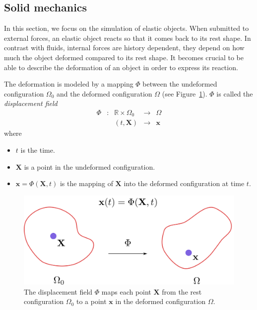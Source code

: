 \subsection{Solid mechanics}
\label{subsec:solidMechanics}
In this section, we focus on the simulation of elastic objects. When submitted to external forces, an elastic object reacts so that it comes back to its rest shape. In contrast with fluids, internal forces are history dependent, they depend on how much the object deformed compared to its rest shape. It becomes crucial to be able to describe the deformation of an object in order to express its reaction. 

The deformation is modeled by a mapping $\Phi$ between the undeformed configuration $\Omega_{0}$ and the deformed configuration $\Omega$ (see Figure~\ref{fig:displacementField}). $\Phi$ is called the \emph{displacement field}
\begin{equation}
\begin{array}{lllll}
\Phi & : & \mathbb{R} \times \Omega_{0} & \longrightarrow & \Omega \\
	 &  & \left(t, \mathbf{X}\right) & \longrightarrow & \mathbf{x}
\end{array}
\end{equation}
where 
\begin{itemize}
\item $t$ is the time.
\item $\mathbf{X}$ is a point in the undeformed configuration.
\item $\mathbf{x}=\Phi(\mathbf{X},t)$ is the mapping of $\mathbf{X}$ into the deformed configuration at time $t$.
\end{itemize}
\begin{figure}[H]
\centering
\includegraphics[width=\linewidth]{./images/continuum_mechanics/displacementField.png}
\caption[STAR mechanics: Displacement field]{\label{fig:displacementField}
 The displacement field $\Phi$ maps each point $\mathbf{X}$ from the rest configuration $\Omega_{0}$ to a point $\mathbf{x}$ in the deformed configuration $\Omega$.}
\end{figure}
